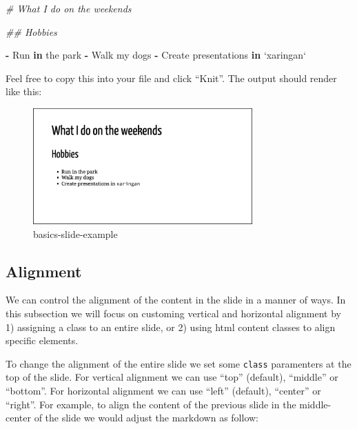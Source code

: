 \documentclass[
]{book}
\newenvironment{Shaded}{\begin{snugshade}}{\end{snugshade}}
\newcommand{\CommentTok}[1]{\textcolor[rgb]{0.37,0.37,0.37}{\textit{#1}}}
\newcommand{\ControlFlowTok}[1]{\textcolor[rgb]{0.27,0.27,0.27}{\textbf{#1}}}
\newcommand{\DataTypeTok}[1]{\textcolor[rgb]{0.27,0.27,0.27}{#1}}
\newcommand{\NormalTok}[1]{#1}
\newcommand{\OperatorTok}[1]{\textcolor[rgb]{0.43,0.43,0.43}{\textbf{#1}}}
\newcommand{\StringTok}[1]{\textcolor[rgb]{0.5,0.5,0.5}{#1}}
\begin{document}
\begin{Shaded}
\begin{Highlighting}[]
\CommentTok{# What I do on the weekends}

\CommentTok{## Hobbies}

\OperatorTok{-}\StringTok{ }\NormalTok{Run }\ControlFlowTok{in}\NormalTok{ the park}
\OperatorTok{-}\StringTok{ }\NormalTok{Walk my dogs}
\OperatorTok{-}\StringTok{ }\NormalTok{Create presentations }\ControlFlowTok{in} \StringTok{`}\DataTypeTok{xaringan}\StringTok{`}
\end{Highlighting}
\end{Shaded}

Feel free to copy this into your file and click ``Knit''. The output should render like this:

\begin{figure}
\centering
\includegraphics[width=0.75\textwidth,height=\textheight]{img/02_basics-slide-example.png}
\caption{basics-slide-example}
\end{figure}

\hypertarget{alignment}{%
\subsection{Alignment}\label{alignment}}

We can control the alignment of the content in the slide in a manner of ways. In this subsection we will focus on customing vertical and horizontal alignment by 1) assigning a class to an entire slide, or 2) using html content classes to align specific elements.

To change the alignment of the entire slide we set some \texttt{class} paramenters at the top of the slide. For vertical alignment we can use ``top'' (default), ``middle'' or ``bottom''. For horizontal alignment we can use ``left'' (default), ``center'' or ``right''. For example, to align the content of the previous slide in the middle-center of the slide we would adjust the markdown as follow:
\end{document}
